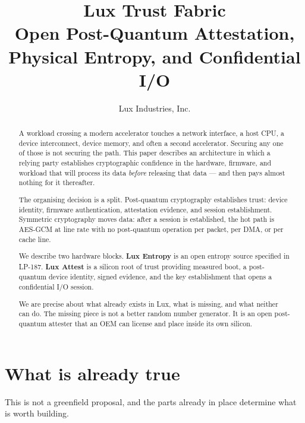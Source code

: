 \documentclass[11pt,a4paper]{article}
\title{Lux Trust Fabric\\
Open Post-Quantum Attestation, Physical Entropy, and Confidential I/O}
\author{Lux Industries, Inc.}
\begin{document}
\maketitle

\begin{abstract}
A workload crossing a modern accelerator touches a network interface, a host
CPU, a device interconnect, device memory, and often a second accelerator.
Securing any one of those is not securing the path. This paper describes an
architecture in which a relying party establishes cryptographic confidence in
the hardware, firmware, and workload that will process its data \emph{before}
releasing that data --- and then pays almost nothing for it thereafter.

The organising decision is a split. Post-quantum cryptography establishes
trust: device identity, firmware authentication, attestation evidence, and
session establishment. Symmetric cryptography moves data: after a session is
established, the hot path is AES-GCM at line rate with no post-quantum
operation per packet, per DMA, or per cache line.

We describe two hardware blocks. \textbf{Lux Entropy} is an open entropy source
specified in LP-187. \textbf{Lux Attest} is a silicon root of trust providing
measured boot, a post-quantum device identity, signed evidence, and the key
establishment that opens a confidential I/O session.

We are precise about what already exists in Lux, what is missing, and what
neither can do. The missing piece is not a better random number generator. It
is an open post-quantum attester that an OEM can license and place inside its
own silicon.
\end{abstract}

\tableofcontents
\newpage

\section{What is already true}

This is not a greenfield proposal, and the parts already in place determine
what is worth building.
\end{document}
